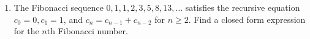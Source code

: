 \documentclass[11pt,a4paper]{book}
\theoremstyle{plain}
\numberwithin{equation}{section}
\newcommand{\ints}{{\mathbb Z}}
\newcommand{\term}{\textbf}
\newenvironment{solution}{\begin{footnotesize}\textbf{Solution:}}{\end{footnotesize}}
\newcounter{test}
\newenvironment{excersizelist}{%
  \renewcommand*{\theenumi}{\thechapter.\arabic{enumi}}%
  \newcommand\itemadvanced{\stepcounter{enumi}\item[$\ast$\, \theenumi.]}
  \begin{enumerate}
}{%
  \end{enumerate}
}
\begin{document}
\begin{excersizelist}
\item \label{exer:fibonacci} The Fibonacci sequence $0,1,1,2,3,5,8,13,\dots$ satisfies the recursive equation $c_0 = 0, c_1 = 1$, and $c_n = c_{n-1} + c_{n-2}$ for $n \geq 2$.  Find a closed form expression for the $n$th Fibonacci number.


\end{excersizelist}








\end{document}
